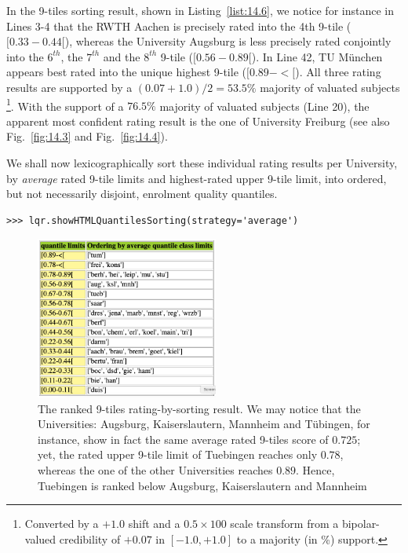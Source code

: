 In the 9-tiles sorting result, shown in Listing~\vref{list:14.6}, we notice for instance in Lines 3-4 that the RWTH Aachen is precisely rated into the 4th 9-tile ($[0.33 - 0.44[$), whereas the University Augsburg is less precisely rated conjointly into the $6^{th}$, the $7^{th}$ and the $8^{th}$ 9-tile ($[0.56 - 0.89[$). In Line 42, TU München appears best rated into the unique highest 9-tile ($[0.89 - <[$). All three rating results are supported by a $(0.07 + 1.0)/2 = 53.5\%$ majority of valuated subjects \footnote{Converted by a $+1.0$ shift and a $0.5 \times 100$ scale transform from a bipolar-valued credibility of $+0.07$ in $[-1.0, +1.0]$ to a majority (in \%) support.}. With the support of a $76.5\%$ majority of valuated subjects (Line 20), the apparent most confident rating result is the one of University Freiburg (see also Fig.~\vref{fig:14.3} and Fig.~\vref{fig:14.4}). 

We shall now lexicographically sort these individual rating results per University, by \emph{average} rated 9-tile limits and highest-rated upper 9-tile limit, into ordered, but not necessarily disjoint, enrolment quality quantiles.
\begin{lstlisting}
>>> lqr.showHTMLQuantilesSorting(strategy='average')
\end{lstlisting}
\begin{figure}[ht]
\sidecaption[t]
\includegraphics[width=6cm]{Figures/14-7-nineTilingOrdering.png}
\caption{The ranked 9-tiles rating-by-sorting result. We may notice that the Universities: Augsburg, Kaiserslautern, Mannheim and Tübingen, for instance, show in fact the same average rated 9-tiles score of $0.725$; yet, the rated upper 9-tile limit of Tuebingen reaches only $0.78$, whereas the one of the other Universities reaches $0.89$. Hence, Tuebingen is ranked below Augsburg, Kaiserslautern and Mannheim}
\label{fig:14.7}       %
\end{figure}

